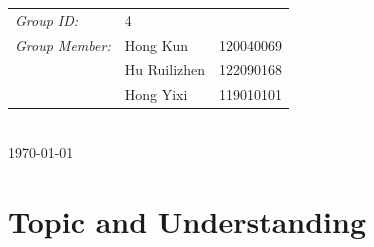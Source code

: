\documentclass[12pt,a4paper]{report}
\begin{document}
\begin{titlepage}
    \begin{minipage}{0.6\textwidth}
        \begin{tabular}{l l l}
            \emph{Group ID:}     & 4                        \\
            \emph{Group Member:} & Hong Kun     & 120040069 \\
                                 & Hu Ruilizhen & 122090168 \\
                                 & Hong Yixi    & 119010101 \\
        \end{tabular}

    \end{minipage}\\[2cm]


    {\large \today}\\[2cm]
    \vfill
\end{titlepage}


\tableofcontents
\newpage



\pagestyle{mypagestyle}


\section{Topic and Understanding}
\end{document}
